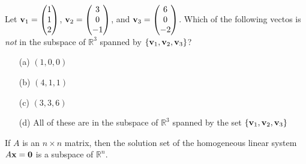 \begin{problem}
    Let ${\bf v}_1 = \begin{pmatrix} 1 \\ 1 \\ 2 \end{pmatrix}$, ${\bf v}_2 = \begin{pmatrix} 3 \\
        0 \\ -1 \end{pmatrix}$, and ${\bf v}_3 = \begin{pmatrix} 6 \\ 0 \\ -2 \end{pmatrix}$.
            Which of the following vectos is {\it not} in the subspace of $\mathbb{R}^3$
            spanned by $\{ {\bf v}_1, {\bf v}_2, {\bf v}_3\}$?
    \begin{enumerate}
        \item[(a)] $(1,0,0)$
        \item[(b)] $(4,1,1)$
        \item[(c)] $(3,3,6)$
        \item[(d)] All of these are in the subspace of $\mathbb{R}^3$ spanned by the set
            $\{{\bf v}_1,{\bf v}_2,{\bf v}_3\}$
    \end{enumerate}
\end{problem}

%             



\begin{thm}
    If $A$ is an $n \times n$ matrix, then the solution set of the homogeneous linear
    system $A{\bf x} = {\bf 0}$ is a subspace of $\mathbb{R}^n$.
\end{thm}

